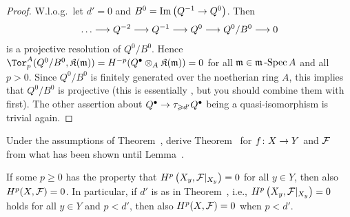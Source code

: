 \documentclass[a4paper,parskip=half,numbers=enddot, DIV=12]{scrreprt}
\renewcommand{\geq}{\geqslant}
\begin{document}
\begin{proof}
	W.l.o.g.\ let $d'=0$ and $B^0=\Im\left(Q^{-1}\morphism Q^0\right)$. Then
	\begin{align*}
		\ldots \morphism Q^{-2}\morphism Q^{-1}\morphism Q^0\morphism Q^0/B^0\morphism 0
	\end{align*}
	is a projective resolution of $Q^0/B^0$. Hence $\Tor_p^A(Q^0/B^0,\KK(\mm))=H^{-p}(Q^\bullet\otimes_A\KK(\mm))=0$ for all $\mathfrak{m}\in\mathfrak{m}\operatorname{-Spec} A$ and all $p>0$. Since $Q^0/B^0$ is finitely generated over the noetherian ring $A$, this implies that $Q^0/B^0$ is projective (this is essentially \cite[Propositions~1.3.1 and~1.3.2]{homalg}, but you should combine them with \cite[Fact~1.2.4]{homalg} first). The other assertion about $Q^\bullet\morphism \tau_{\geq d'}Q^\bullet$ being a quasi-isomorphism is trivial again.
\end{proof}
\begin{exc}
	Under the assumptions of Theorem~, derive Theorem~ for $f\colon X\morphism Y$ and $\mathcal{F}$ from what has been shown until Lemma~.
\end{exc}
\begin{lem}
	If some $p\geq 0$ has the property that $H^p\left(X_y,\mathcal{F}|_{X_y}\right)=0$ for all $y\in Y$, then also $H^p(X,\mathcal{F})=0$. In particular,
	if $d'$ is as in Theorem~, i.e., $H^p\left(X_y,\mathcal{F}|_{X_y}\right)=0$ holds for all $y\in Y$ and $p<d'$, then also $H^p(X,\mathcal{F})=0$ when $p<d'$.
\end{lem}
\end{document}
